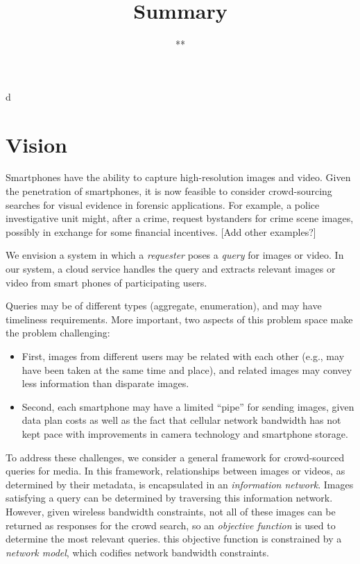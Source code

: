d\documentclass[letterpaper]{sig-alternate-10pt}
\begin{document}
\title{Summary}
\author{**
\vspace{-6pt}
}


\maketitle

%
\section{Vision}

Smartphones have the ability to capture high-resolution images and
video. Given the penetration of smartphones, it is now feasible to
consider crowd-sourcing searches for visual evidence in forensic
applications. For example, a police investigative unit might, after a
crime, request bystanders for crime scene images, possibly in exchange
for some financial incentives. [Add other examples?]

We envision a system in which a \emph{requester} poses a \emph{query}
for images or video. In our system, a cloud service handles the query
and extracts relevant images or video from smart phones of
participating users.

Queries may be of different types (aggregate, enumeration), and may
have timeliness requirements. More important, two aspects of this
problem space make the problem challenging:
\begin{itemize}
\item First, images from different users may be related with each
  other (e.g., may have been taken at the same time and place), and
  related images may convey less information than disparate images.
\item Second, each smartphone may have a limited ``pipe'' for sending
  images, given data plan costs as well as the fact that cellular
  network bandwidth has not kept pace with improvements in camera
  technology and smartphone storage.
\end{itemize}

To address these challenges, we consider a general framework for
crowd-sourced queries for media. In this framework, relationships
between images or videos, as determined by their metadata, is
encapsulated in an \emph{information network}. Images satisfying a
query can be determined by traversing this information
network. However, given wireless bandwidth constraints, not all of
these images can be returned as responses for the crowd search, so an
\emph{objective function} is used to determine the most relevant
queries. this objective function is constrained by a \emph{network
  model}, which codifies network bandwidth constraints.
\end{document}
